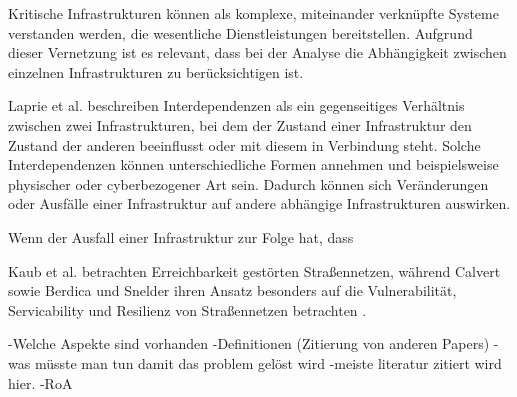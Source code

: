 
Kritische Infrastrukturen können als komplexe, miteinander verknüpfte Systeme verstanden werden, die wesentliche Dienstleistungen bereitstellen\cite{chiaradonna2007}. Aufgrund dieser Vernetzung ist es relevant, dass bei der Analyse die Abhängigkeit zwischen einzelnen Infrastrukturen zu berücksichtigen ist\cite{chiaradonna2007}.

Laprie et al. beschreiben Interdependenzen als ein gegenseitiges Verhältnis zwischen zwei Infrastrukturen, bei dem der Zustand einer Infrastruktur den Zustand der anderen beeinflusst oder mit diesem in Verbindung steht\cite{laprie2007}. Solche Interdependenzen können unterschiedliche Formen annehmen und beispielsweise physischer oder cyberbezogener Art sein\cite{chiaradonna2007}. Dadurch können sich Veränderungen oder Ausfälle einer Infrastruktur auf andere abhängige Infrastrukturen auswirken\cite{laprie2007}.

Wenn der Ausfall einer Infrastruktur zur Folge hat, dass 













Kaub et al. betrachten Erreichbarkeit gestörten Straßennetzen, während Calvert sowie Berdica und Snelder ihren Ansatz besonders auf die Vulnerabilität, Servicability und Resilienz von Straßennetzen betrachten \cite{berdica2002,calvert2017,kaub2024,lickert2024}.




-Welche Aspekte sind vorhanden
-Definitionen (Zitierung von anderen Papers)
-was müsste man tun damit das problem gelöst wird
-meiste literatur zitiert wird hier.
-RoA

%